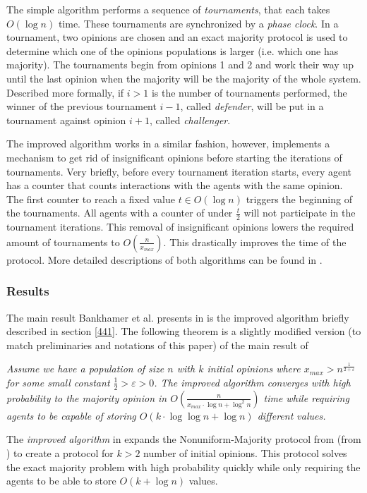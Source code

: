 The simple algorithm performs a sequence of \emph{tournaments}, that each takes $O(\log n)$ time. These tournaments are synchronized by a \emph{phase clock}. In a tournament, two opinions are chosen and an exact majority protocol is used to determine which one of the opinions populations is larger (i.e. which one has majority). The tournaments begin from opinions 1 and 2 and work their way up until the last opinion when the majority will be the majority of the whole system. Described more formally, if $i > 1$ is the number of tournaments performed, the winner of the previous tournament $i - 1$, called \emph{defender}, will be put in a tournament against opinion $i + 1$, called \emph{challenger}. 

The improved algorithm works in a similar fashion, however, implements a mechanism to get rid of insignificant opinions before starting the iterations of tournaments. Very briefly, before every tournament iteration starts, every agent has a counter that counts interactions with the agents with the same opinion. The first counter to reach a fixed value $t \in O(\log n)$ triggers the beginning of the tournaments. All agents with a counter of under $\frac{t}{2}$ will not participate in the tournament iterations. This removal of insignificant opinions lowers the required amount of tournaments to $O(\frac{n}{x_{max}})$. This drastically improves the time of the protocol. More detailed descriptions of both algorithms can be found in \cite{bankhamerPopulationProtocolsExact2022}.

\subsubsection{Results}

The main result Bankhamer et al. presents in \cite{bankhamerPopulationProtocolsExact2022} is the improved algorithm briefly described in section \ref{441}. The following theorem is a slightly modified version (to match preliminaries and notations of this paper) of the main result of \cite{bankhamerPopulationProtocolsExact2022}

 \begin{theorem}
    \textit{
        Assume we have a population of size $n$ with $k$ initial opinions where $x_{max} > n^{\frac{1}{2 + \varepsilon}}$ for some small constant $\frac{1}{2} > \varepsilon > 0$. The \emph{improved algorithm} converges with high probability to the majority opinion in $O(\frac{n}{x_{max} \cdot \log n + \log^2 n})$ time while requiring agents to be capable of storing $O(k \cdot \log \log n + \log n)$ different values.}
 \end{theorem} 

The \emph{improved algorithm} in \cite{bankhamerPopulationProtocolsExact2022} expands the Nonuniform-Majority protocol from  (from \cite{dotyTimeSpaceOptimal2022}) to create a protocol for $k > 2$ number of initial opinions. This protocol solves the exact majority problem with high probability quickly while only requiring the agents to be able to store $O(k + \log n)$ values. 
